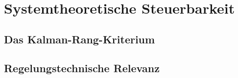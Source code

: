 \section{Systemtheoretische Steuerbarkeit}
\subsection{Das Kalman-Rang-Kriterium}

\subsection{Regelungstechnische Relevanz}


